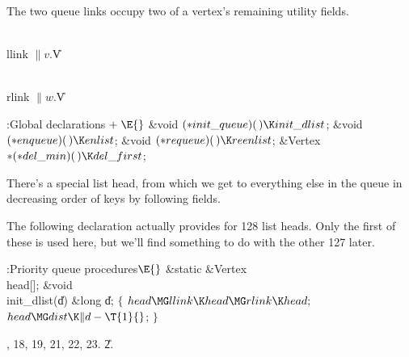 The two queue links occupy two of a vertex's remaining utility fields.

\Y\B\4\D\\{llink}\5
$\|v.{}$\|V%
\par
\B\4\D\\{rlink}\5
$\|w.{}$\|V%
\par
\Y\B\4:Global declarations\X${}\mathrel+\E{}$\6
\&{void} ${}({*}\\{init\_queue})(\,)\K\\{init\_dlist}{}$;\6
\&{void} ${}({*}\\{enqueue})(\,)\K\\{enlist}{}$;\6
\&{void} ${}({*}\\{requeue})(\,)\K\\{reenlist}{}$;\6
\&{Vertex} ${}{*}({*}\\{del\_min})(\,)\K\\{del\_first}{}$;\par
\fi

There's a special list head, from which we get to everything else in the
queue in decreasing order of keys by following  fields.

The following declaration actually provides for 128 list heads. Only the first
of these is used here, but we'll find something to do with the
other 127 later.

\Y\B\4:Priority queue procedures\X${}\E{}$\6
\&{static} \&{Vertex} \\{head}[];\7
\1\1\&{void} \\{init\_dlist}(\|d)\6
\&{long} \|d;\2\2\6
${}\{{}$\1\6
${}\\{head}\MG\\{llink}\K\\{head}\MG\\{rlink}\K\\{head};{}$\6
${}\\{head}\MG\\{dist}\K\|d-\T{1}{}$;\6
\4${}\}{}$\2\par
{}, 18, 19, 21, 22, 23.
\U2.\fi

